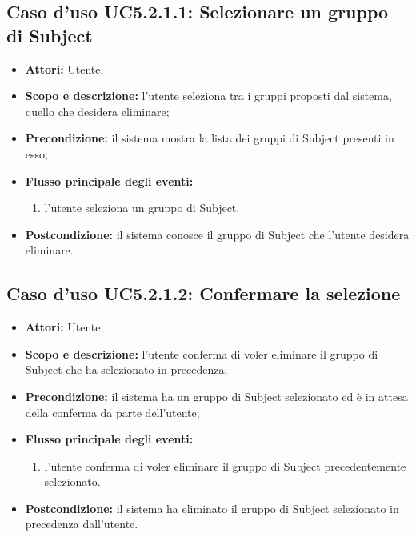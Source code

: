 \subsection{Caso d'uso UC5.2.1.1: Selezionare un gruppo di Subject}
\begin{itemize}
\item \textbf{Attori:} Utente;
\item \textbf{Scopo e descrizione:} l'utente seleziona tra i gruppi proposti dal sistema, quello che desidera eliminare;
\item \textbf{Precondizione:} il sistema mostra la lista dei gruppi di Subject\glossario{} presenti in esso;
\item \textbf{Flusso principale degli eventi:}
\begin{enumerate}
\item l'utente seleziona un gruppo di Subject\glossario{}.
\end{enumerate}
\item \textbf{Postcondizione:} il sistema conosce il gruppo di Subject\glossario{} che l'utente desidera eliminare.
\end{itemize}

\subsection{Caso d'uso UC5.2.1.2: Confermare la selezione}
\begin{itemize}
\item \textbf{Attori:} Utente;
\item \textbf{Scopo e descrizione:} l'utente conferma di voler eliminare il gruppo di Subject\glossario{} che ha selezionato in precedenza;
\item \textbf{Precondizione:} il sistema ha un gruppo di Subject\glossario{} selezionato ed è in attesa della conferma da parte dell'utente;
\item \textbf{Flusso principale degli eventi:}
\begin{enumerate}
\item l'utente conferma di voler eliminare il gruppo di Subject\glossario{} precedentemente selezionato.
\end{enumerate}
\item \textbf{Postcondizione:} il sistema ha eliminato il gruppo di Subject\glossario{} selezionato in precedenza dall'utente.
\end{itemize}


